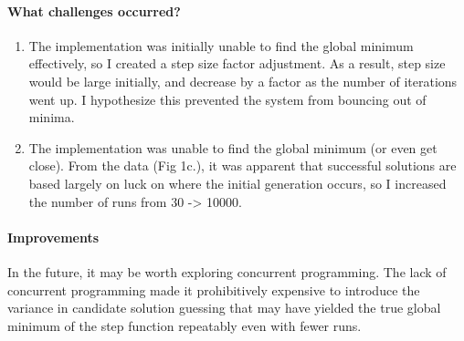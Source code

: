 \documentclass{article}
\begin{document}
\paragraph{What challenges occurred?}
\begin{enumerate}
    \item The implementation was initially unable to find the global minimum effectively, so I created a step size factor adjustment. As a result, step size would be large initially, and decrease by a factor as the number of iterations went up. I hypothesize this prevented the system from bouncing out of minima.
    \item The implementation was unable to find the global minimum (or even get close). From the data (Fig 1c.), it was apparent that successful solutions are based largely on luck on where the initial generation occurs, so I increased the number of runs from 30 -> 10000.
\end{enumerate}

\paragraph{Improvements} In the future, it may be worth exploring concurrent programming. The lack of concurrent programming made it prohibitively expensive to introduce the variance in candidate solution guessing that may have yielded the true global minimum of the step function repeatably even with fewer runs. 
\end{document}
